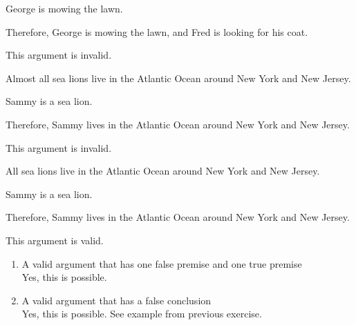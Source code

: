 \begin{enumerate}[(1)]
\noindent\begin{minipage}{0.99\textwidth}
\item
\begin{earg}
\item George is mowing the lawn.
\item Therefore, George is mowing the lawn, and Fred is looking for his coat.
\end{earg}
\noindent This argument is invalid.
\end{minipage}

\item
\begin{earg}
\item Almost all sea lions live in the Atlantic Ocean around New York and New Jersey. 
\item Sammy is a sea lion. 
\item Therefore, Sammy lives in the Atlantic Ocean around New York and New Jersey.
\end{earg}
\noindent This argument is invalid.

\item
\begin{earg}
\item All sea lions live in the Atlantic Ocean around New York and New Jersey. 
\item Sammy is a sea lion. 
\item Therefore, Sammy lives in the Atlantic Ocean around New York and New Jersey.
\end{earg}
\noindent This argument is valid.

\end{enumerate}

\problempart
\begin{enumerate}[(1)]
\item A valid argument that has one false premise and one true premise\\
\noindent Yes, this is possible. 

\item A valid argument that has a false conclusion\\
Yes, this is possible. See example from previous exercise.\smallskip

\end{enumerate}

